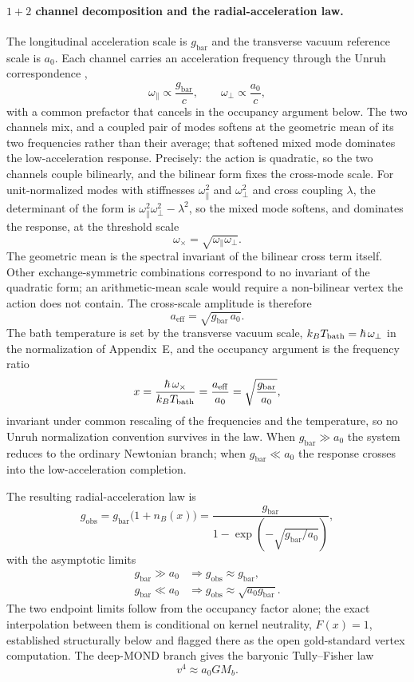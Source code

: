 \documentclass[11pt]{article}
\begin{document}
\paragraph{$1+2$ channel decomposition and the radial-acceleration law.}
The longitudinal acceleration scale is $g_{\mathrm{bar}}$ and the transverse vacuum reference scale is $a_0$. Each channel carries an acceleration frequency through the Unruh correspondence \citep{Unruh1976},
\[
\omega_\parallel\propto\frac{g_{\mathrm{bar}}}{c},
\qquad
\omega_\perp\propto\frac{a_0}{c},
\]
with a common prefactor that cancels in the occupancy argument below. The two channels mix, and a coupled pair of modes softens at the geometric mean of its two frequencies rather than their average; that softened mixed mode dominates the low-acceleration response. Precisely: the action is quadratic, so the two channels couple bilinearly, and the bilinear form fixes the cross-mode scale. For unit-normalized modes with stiffnesses $\omega_\parallel^2$ and $\omega_\perp^2$ and cross coupling $\lambda$, the determinant of the form is $\omega_\parallel^2\omega_\perp^2-\lambda^2$, so the mixed mode softens, and dominates the response, at the threshold scale
\[
\omega_\times=\sqrt{\omega_\parallel\omega_\perp}.
\]
The geometric mean is the spectral invariant of the bilinear cross term itself. Other exchange-symmetric combinations correspond to no invariant of the quadratic form; an arithmetic-mean scale would require a non-bilinear vertex the action does not contain. The cross-scale amplitude is therefore
\[
a_{\mathrm{eff}}=\sqrt{g_{\mathrm{bar}}\,a_0}.
\]
The bath temperature is set by the transverse vacuum scale, $k_BT_{\rm bath}=\hbar\,\omega_\perp$ in the normalization of Appendix~E, and the occupancy argument is the frequency ratio
\[
x=\frac{\hbar\,\omega_\times}{k_BT_{\rm bath}}=\frac{a_{\mathrm{eff}}}{a_0}=\sqrt{\frac{g_{\mathrm{bar}}}{a_0}},
\]
invariant under common rescaling of the frequencies and the temperature, so no Unruh normalization convention survives in the law.
When $g_{\mathrm{bar}}\gg a_0$ the system reduces to the ordinary Newtonian branch; when $g_{\mathrm{bar}}\ll a_0$ the response crosses into the low-acceleration completion.

The resulting radial-acceleration law is
\[
g_{\mathrm{obs}}
=
g_{\mathrm{bar}}\bigl(1+n_B(x)\bigr)
=
\frac{g_{\mathrm{bar}}}{1-\exp\!\left(-\sqrt{g_{\mathrm{bar}}/a_0}\right)},
\]
with the asymptotic limits
\begin{align}
g_{\mathrm{bar}}\gg a_0 &\Longrightarrow g_{\mathrm{obs}}\approx g_{\mathrm{bar}},\\
g_{\mathrm{bar}}\ll a_0 &\Longrightarrow g_{\mathrm{obs}}\approx \sqrt{a_0g_{\mathrm{bar}}}.
\end{align}
The two endpoint limits follow from the occupancy factor alone; the exact interpolation between them is conditional on kernel neutrality, $F(x)=1$, established structurally below and flagged there as the open gold-standard vertex computation.
The deep-MOND branch gives the baryonic Tully--Fisher law \citep{TullyFisher1977,McGaugh2000}
\[
v^4\approx a_0GM_b.
\]
\end{document}
